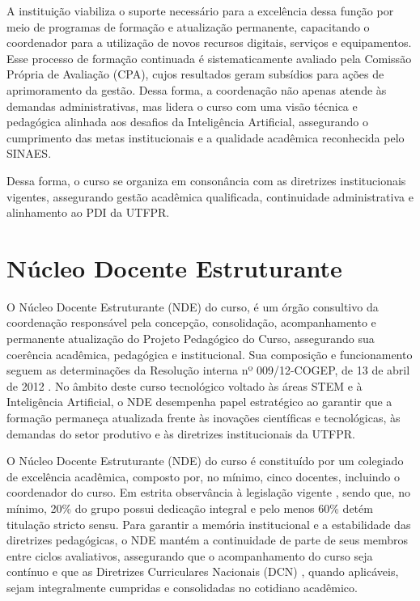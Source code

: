 A instituição viabiliza o suporte necessário para a excelência dessa função por meio de programas de formação e atualização permanente, capacitando o coordenador para a utilização de novos recursos digitais, serviços e equipamentos. Esse processo de formação continuada é sistematicamente avaliado pela Comissão Própria de Avaliação (CPA), cujos resultados geram subsídios para ações de aprimoramento da gestão. Dessa forma, a coordenação não apenas atende às demandas administrativas, mas lidera o curso com uma visão técnica e pedagógica alinhada aos desafios da Inteligência Artificial, assegurando o cumprimento das metas institucionais e a qualidade acadêmica reconhecida pelo SINAES.

Dessa forma, o curso se organiza em consonância com as diretrizes institucionais vigentes, assegurando gestão acadêmica qualificada, continuidade administrativa e alinhamento ao PDI da UTFPR.


\section{Núcleo Docente Estruturante}

O Núcleo Docente Estruturante (NDE) do curso, é um órgão consultivo da coordenação responsável pela concepção, consolidação, acompanhamento e permanente atualização do Projeto Pedagógico do Curso, assegurando sua coerência acadêmica, pedagógica e institucional. Sua composição e funcionamento seguem as determinações da Resolução interna nº 009/12-COGEP, de 13 de abril de 2012 \cite{UTFPR_NDE_2012}. No âmbito deste curso tecnológico voltado às áreas STEM e à Inteligência Artificial, o NDE desempenha papel estratégico ao garantir que a formação permaneça atualizada frente às inovações científicas e tecnológicas, às demandas do setor produtivo e às diretrizes institucionais da UTFPR.

O Núcleo Docente Estruturante (NDE) do curso é constituído por um colegiado de excelência acadêmica, composto por, no mínimo, cinco docentes, incluindo o coordenador do curso. Em estrita observância à legislação vigente \cite{CONAES_NDE_2010}, sendo que, no mínimo, 20\% do grupo possui dedicação integral e pelo menos 60\% detém titulação stricto sensu. Para garantir a memória institucional e a estabilidade das diretrizes pedagógicas, o NDE mantém a continuidade de parte de seus membros entre ciclos avaliativos, assegurando que o acompanhamento do curso seja contínuo e que as Diretrizes Curriculares Nacionais (DCN) \cite{MEC_2016}, quando aplicáveis, sejam integralmente cumpridas e consolidadas no cotidiano acadêmico.

